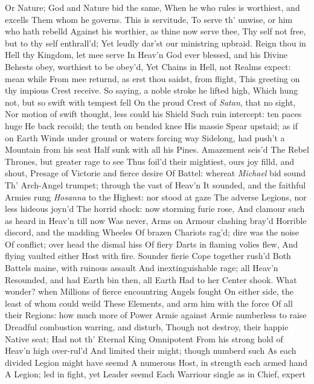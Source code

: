 \documentclass[11pt]{book}
\begin{document}
Or Nature; God and Nature bid the same, 
When he who rules is worthiest, and excells 
Them whom he governs.  This is servitude, 
To serve th' unwise, or him who hath rebelld 
Against his worthier, as thine now serve thee, 
Thy self not free, but to thy self enthrall'd; 
Yet leudly dar'st our ministring upbraid. 
Reign thou in Hell thy Kingdom, let mee serve 
In Heav'n God ever blessed, and his Divine 
Behests obey, worthiest to be obey'd, 
Yet Chains in Hell, not Realms expect: mean while 
From mee returnd, as erst thou saidst, from flight, 
This greeting on thy impious Crest receive. 
\quad So saying, a noble stroke he lifted high, 
Which hung not, but so swift with tempest fell 
On the proud Crest of \textit{Satan}, that no sight, 
Nor motion of swift thought, less could his Shield 
Such ruin intercept: ten paces huge 
He back recoild; the tenth on bended knee 
His massie Spear upstaid; as if on Earth 
Winds under ground or waters forcing way 
Sidelong, had push't a Mountain from his seat 
Half sunk with all his Pines.  Amazement seis'd 
The Rebel Thrones, but greater rage to see 
Thus foil'd their mightiest, ours joy filld, and shout, 
Presage of Victorie and fierce desire 
Of Battel: whereat \textit{Michael} bid sound 
Th' Arch-Angel trumpet; through the vast of Heav'n 
It sounded, and the faithful Armies rung 
\textit{Hosanna} to the Highest: nor stood at gaze 
The adverse Legions, nor less hideous joyn'd 
The horrid shock: now storming furie rose, 
And clamour such as heard in Heav'n till now 
Was never, Arms on Armour clashing bray'd 
Horrible discord, and the madding Wheeles 
Of brazen Chariots rag'd; dire was the noise 
Of conflict; over head the dismal hiss 
Of fiery Darts in flaming volies flew, 
And flying vaulted either Host with fire. 
Sounder fierie Cope together rush'd 
Both Battels maine, with ruinous assault 
And inextinguishable rage; all Heav'n 
Resounded, and had Earth bin then, all Earth 
Had to her Center shook.  What wonder? when 
Millions of fierce encountring Angels fought 
On either side, the least of whom could weild 
These Elements, and arm him with the force 
Of all their Regions: how much more of Power 
Armie against Armie numberless to raise 
Dreadful combustion warring, and disturb, 
Though not destroy, their happie Native seat; 
Had not th' Eternal King Omnipotent 
From his strong hold of Heav'n high over-rul'd 
And limited their might; though numberd such 
As each divided Legion might have seemd 
A numerous Host, in strength each armed hand 
A Legion; led in fight, yet Leader seemd 
Each Warriour single as in Chief, expert 
\end{document}

